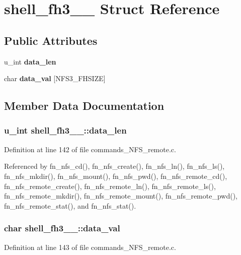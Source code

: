\section{shell\_\-fh3\_\-\_\- Struct Reference}
\label{structshell__fh3____}
\subsection*{Public Attributes}
\begin{CompactItemize}
\item 
u\_\-int {\bf data\_\-len}
\item 
char {\bf data\_\-val} [NFS3\_\-FHSIZE]
\end{CompactItemize}


\subsection{Member Data Documentation}
\subsubsection{\setlength{\rightskip}{0pt plus 5cm}u\_\-int {\bf shell\_\-fh3\_\-\_\-::data\_\-len}}\label{structshell__fh3_____o0}




Definition at line 142 of file commands\_\-NFS\_\-remote.c.

Referenced by fn\_\-nfs\_\-cd(), fn\_\-nfs\_\-create(), fn\_\-nfs\_\-ln(), fn\_\-nfs\_\-ls(), fn\_\-nfs\_\-mkdir(), fn\_\-nfs\_\-mount(), fn\_\-nfs\_\-pwd(), fn\_\-nfs\_\-remote\_\-cd(), fn\_\-nfs\_\-remote\_\-create(), fn\_\-nfs\_\-remote\_\-ln(), fn\_\-nfs\_\-remote\_\-ls(), fn\_\-nfs\_\-remote\_\-mkdir(), fn\_\-nfs\_\-remote\_\-mount(), fn\_\-nfs\_\-remote\_\-pwd(), fn\_\-nfs\_\-remote\_\-stat(), and fn\_\-nfs\_\-stat().
\subsubsection{\setlength{\rightskip}{0pt plus 5cm}char {\bf shell\_\-fh3\_\-\_\-::data\_\-val}}\label{structshell__fh3_____o1}




Definition at line 143 of file commands\_\-NFS\_\-remote.c.

